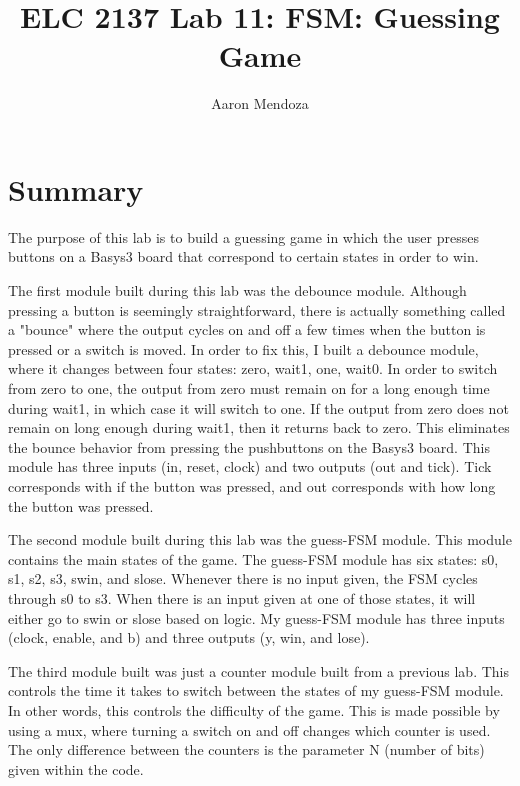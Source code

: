 \documentclass[11pt]{article}
\begin{document}
\title{ELC 2137 Lab 11: FSM: Guessing Game}
\author{Aaron Mendoza}

\maketitle


\section*{Summary}

The purpose of this lab is to build a guessing game in which the user presses buttons on a Basys3 board that correspond to certain states in order to win. 

The first module built during this lab was the debounce module. Although pressing a button is seemingly straightforward, there is actually something called a "bounce" where the output cycles on and off a few times when the button is pressed or a switch is moved. In order to fix this, I built a debounce module, where it changes between four states: zero, wait1, one, wait0. In order to switch from zero to one, the output from zero must remain on for a long enough time during wait1, in which case it will switch to one. If the output from zero does not remain on long enough during wait1, then it returns back to zero. This eliminates the bounce behavior from pressing the pushbuttons on the Basys3 board. This module has three inputs (in, reset, clock) and two outputs (out and tick). Tick corresponds with if the button was pressed, and out corresponds with how long the button was pressed.

The second module built during this lab was the guess-FSM module. This module contains the main states of the game. The guess-FSM module has six states: s0, s1, s2, s3, swin, and slose. Whenever there is no input given, the FSM cycles through s0 to s3. When there is an input given at one of those states, it will either go to swin or slose based on logic. My guess-FSM module has three inputs (clock, enable, and b) and three outputs (y, win, and lose). 

The third module built was just a counter module built from a previous lab. This controls the time it takes to switch between the states of my guess-FSM module. In other words, this controls the difficulty of the game. This is made possible by using a mux, where turning a switch on and off changes which counter is used. The only difference between the counters is the parameter N (number of bits) given within the code.  
\end{document}
